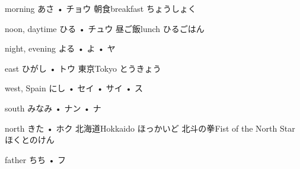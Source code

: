 



\setcounter{cardnum}{1}

		{morning}
		{あさ • チョウ}
		{朝食}{breakfast ちょうしょく}
		{}{}
		{}{}
		{}{}
		{}{}

		{noon, daytime}
		{ひる • チュウ}
		{昼ご飯}{lunch ひるごはん}
		{}{}
		{}{}
		{}{}
		{}{}

		{night, evening}
		{よる • よ • ヤ}
		{}{}
		{}{}
		{}{}
		{}{}
		{}{}

		{east}
		{ひがし • トウ}
		{東京}{Tokyo とうきょう}
		{}{}
		{}{}
		{}{}
		{}{}

		{west, Spain}
		{にし • セイ • サイ • ス}
		{}{}
		{}{}
		{}{}
		{}{}
		{}{}

		{south}
		{みなみ • ナン • ナ}
		{}{}
		{}{}
		{}{}
		{}{}
		{}{}

		{north}
		{きた • ホク}
		{北海道}{Hokkaido ほっかいど}
		{北斗の拳}{Fist of the North Star ほくとのけん}
		{}{}
		{}{}
		{}{}

		{father}
		{ちち • フ}
		{}{}
		{}{}
		{}{}
		{}{}
		{}{}

